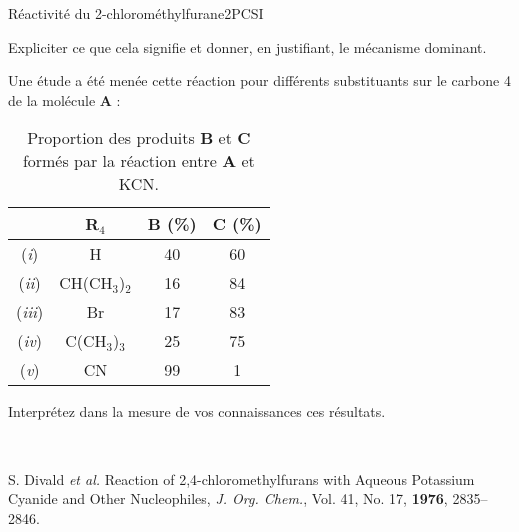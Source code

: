 \begin{exercise}{Réactivité du 2-chlorométhylfurane}{2}{PCSI}
\begin{questions}
    \question Expliciter ce que cela signifie et donner, en justifiant, le mécanisme dominant.
    
\begin{EnvUplevel}
    Une étude a été menée cette réaction pour différents substituants sur le carbone 4 de la molécule \textbf{A} :
    \begin{table}[H]
    \centering
    \begin{tabular}{cccc}
        & R$_4$ & \textbf{B} (\%) & \textbf{C} (\%) \\ \hline\hline
       (\textit{i})    &  H    & 40              & 60              \\ \hline
       (\textit{ii})   &  CH(CH$_3$)$_2$     & 16              & 84              \\ 
       (\textit{iii})  &  Br     & 17              & 83             \\  
       (\textit{iv})   &  C(CH$_3$)$_3$     & 25              & 75              \\           
       (\textit{v})   &  CN     & 99              & 1           \\    \hline
    \end{tabular}
    \caption{Proportion des produits \textbf{B} et \textbf{C} formés par la réaction entre \textbf{A} et KCN.}
    \end{table}
\end{EnvUplevel}
    \question Interprétez dans la mesure de vos connaissances ces résultats.
\end{questions}~

\vfill

\plusloin S. Divald \emph{et al.} Reaction of 2,4-chloromethylfurans with Aqueous Potassium Cyanide and Other Nucleophiles, \textit{J. Org. Chem.}, Vol. 41, No. 17, \textbf{1976},  2835--2846.
\end{exercise}